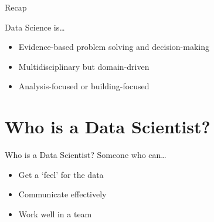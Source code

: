 \begin{frame}{Recap}
    \begin{block}{Data Science is\ldots}
        \begin{itemize}
            \setlength{\itemsep}{0.75em}
            \item \alert{Evidence\hyp{}based problem solving and
                         decision\hyp{}making}
            \item Multidisciplinary but domain\hyp{}driven
            \item Analysis\hyp{}focused or building\hyp{}focused
        \end{itemize}
    \end{block}
\end{frame}

\section{Who is a Data Scientist?}

\begin{frame}{Who is a Data Scientist?}
    Someone who can\ldots
    \begin{itemize}
        \setlength{\itemsep}{0.75em}
        \item Get a `feel' for the data
        \item Communicate effectively
        \item Work well in a team
    \end{itemize}
\end{frame}

